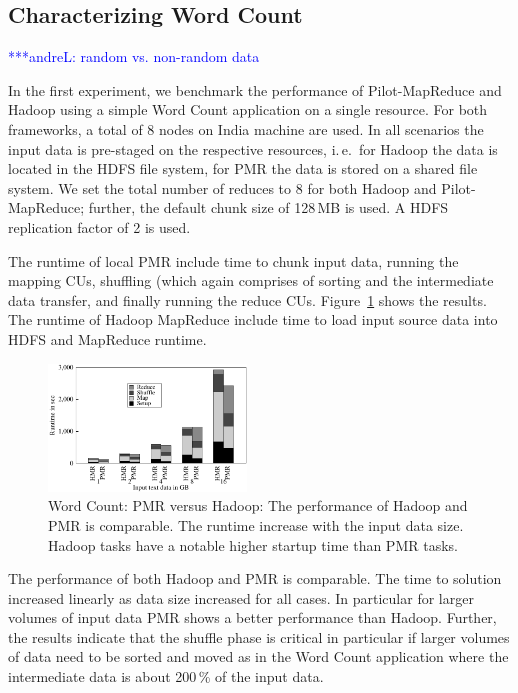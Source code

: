 \documentclass{acm_proc_article-sp}
\newcommand{\alnote}[1]{ {\textcolor{blue} { ***andreL: #1 }}}
\newcommand{\alnote}[1]{}
\newcommand{\pilotmapreduce}{Pilot-MapReduce\xspace}
\begin{document}


\subsection{Characterizing Word Count}
\alnote{random vs. non-random data}

In the first experiment, we benchmark the performance of \pilotmapreduce and
Hadoop using a simple Word Count application on a single resource. For both
frameworks, a total of 8 nodes on India machine are used. In all scenarios the
input data is pre-staged on the respective resources, i.\,e.\ for Hadoop the
data is located in the HDFS file system, for PMR the data is stored on a shared
file system. We set the total number of reduces to 8 for both Hadoop and
\pilotmapreduce; further, the default chunk size of 128\,MB is used. A HDFS
replication factor of 2 is used.

The runtime of local PMR include time to chunk input data, running the mapping
CUs, shuffling (which again comprises of sorting and the intermediate data
transfer, and finally running the reduce CUs.
Figure~\ref{fig:figures_wc_pmr_hmr} shows the results. The runtime
of Hadoop MapReduce include time to load input source data into HDFS and
MapReduce runtime.

\begin{figure}[ht]
	\centering
		\includegraphics[width=0.47\textwidth]{figures/wc_pmr_hmr.pdf}
\caption{Word Count: PMR versus Hadoop: The performance of Hadoop and PMR is 
comparable. The runtime increase with the input data size. Hadoop tasks have a 
notable higher startup time than PMR tasks.} 	
\label{fig:figures_wc_pmr_hmr}
\end{figure}		
	
The performance of both Hadoop and PMR is comparable. The time to solution 
increased linearly as data size increased for all cases. In particular for 
larger volumes of input data PMR shows a better performance than Hadoop. 
Further, the results indicate that the shuffle phase is critical in particular 
if larger volumes of data need to be sorted and moved as in the Word Count 
application where the intermediate data is about 200\,\% of the input data.
\end{document}
